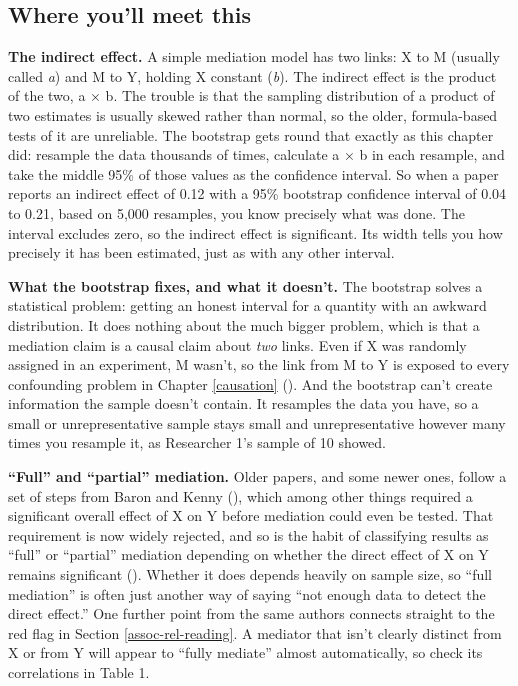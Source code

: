 \documentclass[
]{book}
\begin{document}
\subsection{Where you'll meet this}\label{where-youll-meet-this-4}

\textbf{The indirect effect.} A simple mediation model has two links: X to M (usually called \emph{a}) and M to Y, holding X constant (\emph{b}). The indirect effect is the product of the two, a × b. The trouble is that the sampling distribution of a product of two estimates is usually skewed rather than normal, so the older, formula-based tests of it are unreliable. The bootstrap gets round that exactly as this chapter did: resample the data thousands of times, calculate a × b in each resample, and take the middle 95\% of those values as the confidence interval. So when a paper reports an indirect effect of 0.12 with a 95\% bootstrap confidence interval of 0.04 to 0.21, based on 5,000 resamples, you know precisely what was done. The interval excludes zero, so the indirect effect is significant. Its width tells you how precisely it has been estimated, just as with any other interval.

\textbf{What the bootstrap fixes, and what it doesn't.} The bootstrap solves a statistical problem: getting an honest interval for a quantity with an awkward distribution. It does nothing about the much bigger problem, which is that a mediation claim is a causal claim about \emph{two} links. Even if X was randomly assigned in an experiment, M wasn't, so the link from M to Y is exposed to every confounding problem in Chapter \ref{causation} (). And the bootstrap can't create information the sample doesn't contain. It resamples the data you have, so a small or unrepresentative sample stays small and unrepresentative however many times you resample it, as Researcher 1's sample of 10 showed.

\textbf{``Full'' and ``partial'' mediation.} Older papers, and some newer ones, follow a set of steps from Baron and Kenny (), which among other things required a significant overall effect of X on Y before mediation could even be tested. That requirement is now widely rejected, and so is the habit of classifying results as ``full'' or ``partial'' mediation depending on whether the direct effect of X on Y remains significant (). Whether it does depends heavily on sample size, so ``full mediation'' is often just another way of saying ``not enough data to detect the direct effect.'' One further point from the same authors connects straight to the red flag in Section \ref{assoc-rel-reading}. A mediator that isn't clearly distinct from X or from Y will appear to ``fully mediate'' almost automatically, so check its correlations in Table 1.
\end{document}
